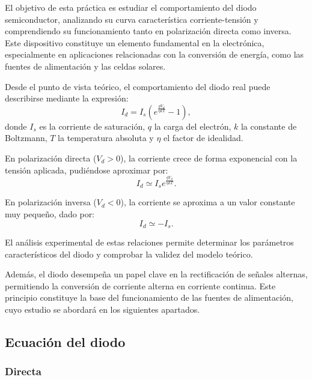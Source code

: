 \documentclass[a4paper,12pt]{article}
\begin{document}
El objetivo de esta práctica es estudiar el comportamiento del diodo semiconductor, analizando su curva característica corriente-tensión y comprendiendo su funcionamiento tanto en polarización directa como inversa. Este dispositivo constituye un elemento fundamental en la electrónica, especialmente en aplicaciones relacionadas con la conversión de energía, como las fuentes de alimentación y las celdas solares.

Desde el punto de vista teórico, el comportamiento del diodo real puede describirse mediante la expresión:
\begin{equation}
I_d = I_s \left( e^{\frac{q V_d}{\eta k T}} - 1 \right),
\end{equation}
donde $I_s$ es la corriente de saturación, $q$ la carga del electrón, $k$ la constante de Boltzmann, $T$ la temperatura absoluta y $\eta$ el factor de idealidad.

En polarización directa ($V_d > 0$), la corriente crece de forma exponencial con la tensión aplicada, pudiéndose aproximar por:
\begin{equation}
I_d \simeq I_s e^{\frac{q V_d}{\eta k T}}.
\end{equation}

En polarización inversa ($V_d < 0$), la corriente se aproxima a un valor constante muy pequeño, dado por:
\begin{equation}
I_d \simeq -I_s.
\end{equation}

El análisis experimental de estas relaciones permite determinar los parámetros característicos del diodo y comprobar la validez del modelo teórico.

Además, el diodo desempeña un papel clave en la rectificación de señales alternas, permitiendo la conversión de corriente alterna en corriente continua. Este principio constituye la base del funcionamiento de las fuentes de alimentación, cuyo estudio se abordará en los siguientes apartados.
\subsection{Ecuación del diodo}
\subsubsection{Directa}
\end{document}
